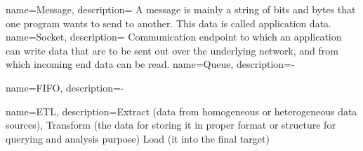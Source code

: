 {
    name=Message,
    description={
        A message is mainly a string of bits and bytes that one program 
        wants to send to another. This data is called application data.  
    }
}
{
    name=Socket,
    description={
        Communication endpoint to which an application can write data
        that are to be sent out over the underlying network, and from which incoming end
        data can be read. \cite{TAN06}
    }
}
{
    name=Queue,
    description={-}
}


{
    name=FIFO,
    description={-}
}

{
    name=ETL,
    description={Extract (data from homogeneous or heterogeneous data sources), 
         Transform (the data for storing it in proper format or structure
         for querying and analysis purpose)
         Load (it into the final target)
    }
}

